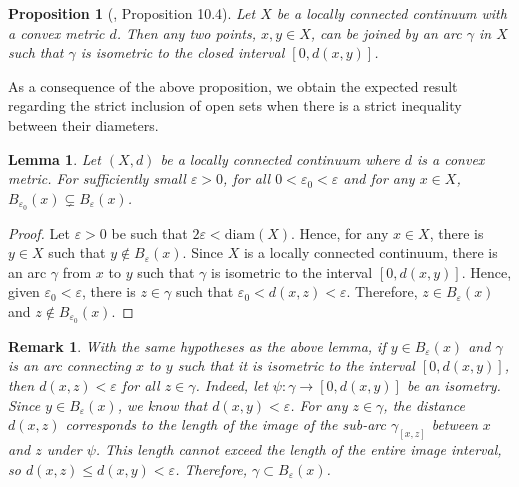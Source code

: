 \documentclass[sn-mathphys-num]{sn-jnl}%
\theoremstyle{thmstyleone}%
\newtheorem{proposition}{Proposition}%
\newtheorem{lemma}{Lemma}
\theoremstyle{thmstyletwo}%
\newtheorem{remark}{Remark}%
\theoremstyle{thmstylethree}%
\begin{document}
\begin{proposition}[\cite{illanes_nadler_1999}, Proposition 10.4]\label{prop:loc-conn-isometric-arc}
    Let $X$ be a locally connected continuum with a convex metric $d$. Then any two points, $x, y \in X$, can be joined by an arc $\gamma$ in $X$ such that $\gamma$ is isometric to the closed interval $[0, d(x, y)]$.\\
\end{proposition}

As a consequence of the above proposition, we obtain the expected result regarding the strict inclusion of open sets when there is a strict inequality between their diameters.\\

\begin{lemma}
    Let $(X, d)$ be a locally connected continuum where $d$ is a convex metric. For sufficiently small $\varepsilon > 0$, for all $0 < \varepsilon_0 < \varepsilon$ and for any $x \in X$, $B_{\varepsilon_0}(x) \subsetneq B_\varepsilon(x)$.
\end{lemma}
\begin{proof}
    Let $\varepsilon > 0$ be such that $2\varepsilon < \text{diam}(X)$. Hence, for any $x \in X$, there is $y \in X$ such that $y \notin B_\varepsilon(x)$. Since $X$ is a locally connected continuum, there is an arc $\gamma$ from $x$ to $y$ such that $\gamma$ is isometric to the interval $[0, d(x, y)]$. Hence, given $\varepsilon_0 < \varepsilon$, there is $z \in \gamma$ such that $\varepsilon_0 < d(x, z) < \varepsilon$. Therefore, $z \in B_\varepsilon(x)$ and $z \notin B_{\varepsilon_0}(x)$.
\end{proof}

\begin{remark}\label{remark:isometric-curve-contained-open-ball}
    With the same hypotheses as the above lemma, if $y \in B_\varepsilon(x)$ and $\gamma$ is an arc connecting $x$ to $y$ such that it is isometric to the interval $[0, d(x, y)]$, then $d(x, z) < \varepsilon$ for all $z \in \gamma$. Indeed, let $\psi: \gamma \to [0, d(x, y)]$ be an isometry. Since $y \in B_\varepsilon(x)$, we know that $d(x, y) < \varepsilon$. For any $z \in \gamma$, the distance $d(x, z)$ corresponds to the length of the image of the sub-arc $\gamma_{[x, z]}$ between $x$ and $z$ under $\psi$. This length cannot exceed the length of the entire image interval, so $d(x,z) \leq d(x,y) < \varepsilon$. Therefore, $\gamma \subset B_\varepsilon(x)$.\\
\end{remark}
\end{document}
